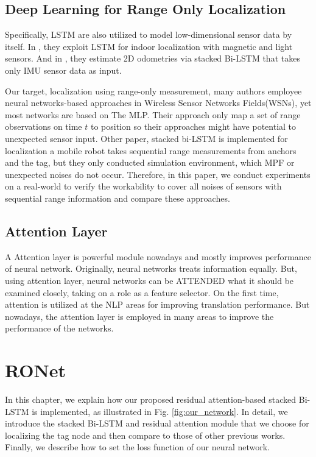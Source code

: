 \documentclass[letterpaper, 10 pt, conference]{ieeeconf}  %
\begin{document}
\subsection{Deep Learning for Range Only Localization}

Specifically, LSTM are also utilized to model low-dimensional sensor data by itself. In \cite{wang2018deepml}, they exploit LSTM for indoor localization with magnetic and light sensors. And in \cite{chen2018ionet}, they estimate 2D odometries via stacked Bi-LSTM that takes only IMU sensor data as input. 

Our target, localization using range-only measurement, many authors employee neural networks-based approaches in Wireless Sensor Networks Fields(WSNs)\cite{rahman2009localization, abdelhadi2013efficient, kumar2016localization}, yet most networks are based on The MLP. Their approach only map a set of range observations on time $t$ to position so their approaches might have potential to unexpected sensor input. Other paper\cite{lim2018effective}, stacked bi-LSTM is implemented for localization a mobile robot takes sequential range measurements from anchors and the tag, but they only conducted simulation environment, which MPF or unexpected noises do not occur. Therefore, in this paper, we conduct experiments on a real-world to verify the workability to cover all noises of sensors with sequential range information and compare these approaches.

\subsection{Attention Layer}

A Attention layer is powerful module nowadays and mostly improves performance of neural network. Originally, neural networks treats information equally. But, using attention layer, neural networks can be ATTENDED what it should be examined closely, taking on a role as a feature selector\cite{wang2017residual}. On the first time, attention is utilized at the NLP areas for improving translation performance\cite{luong2015effective}. But nowadays, the attention layer is employed in many areas to improve the performance of the networks. 
 
 
 
\section{RONet}

In this chapter, we explain how our proposed residual attention-based stacked Bi-LSTM is implemented, as illustrated in Fig. \ref{fig:our_network}. 
In detail, we introduce the stacked Bi-LSTM and residual attention module that we choose for localizing the tag node and then compare to those of other previous works. Finally, we describe how to set the loss function of our neural network. 
\end{document}
